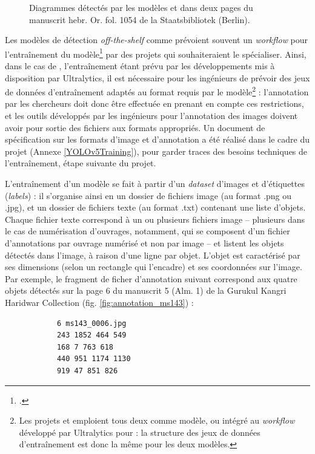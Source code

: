 \begin{figure}[H]
\begin{subfigure}{1\linewidth}
			\end{subfigure}
			\caption{Diagrammes détectés par les modèles \yolov et \docex dans deux pages du manuscrit hebr. Or. fol. 1054 de la Staatsbibliotek (Berlin).}
			\label{fig:performances_modeles}
		\end{figure}
		
		Les modèles de détection \textit{off-the-shelf} comme \yolov prévoient souvent un \textit{workflow} pour l'entraînement du modèle\footcite{sharmaTrainingYOLOv5Object2022} par des projets qui souhaiteraient le spécialiser. Ainsi, dans le cas de \yolov, l'entraînement étant prévu par les développements mis à disposition par Ultralytics, il est nécessaire pour les ingénieurs de prévoir des jeux de données d'entraînement adaptés au format requis par le modèle\footnote{Les projets \vhs et \eida emploient tous deux \yolov comme modèle, ou \docex intégré au \textit{workflow} développé par Ultralytics pour \yolov : la structure des jeux de données d'entraînement est donc la même pour les deux modèles.} : l'annotation par les chercheurs doit donc être effectuée en prenant en compte ces restrictions, et les outils développés par les ingénieurs pour l'annotation des images doivent avoir pour sortie des fichiers aux formats appropriés. Un document de spécification sur les formats d'image et d'annotation a été réalisé dans le cadre du projet \eida (Annexe \ref{YOLOv5Training}), pour garder traces des besoins techniques de l'entraînement, étape suivante du projet. 
		
		L'entraînement d'un modèle \yolov se fait à partir d'un \textit{dataset} d'images et d'étiquettes (\textit{labels}) : il s'organise ainsi en un dossier de fichiers image (au format .png ou .jpg), et un dossier de fichiers texte (au format .txt) contenant une liste d'objets. Chaque fichier texte correspond à un ou plusieurs fichiers image -- plusieurs dans le cas de numérisation d'ouvrages, notamment, qui se composent d'un fichier d'annotations par ouvrage numérisé et non par image -- et listent les objets détectés dans l'image, à raison d'une ligne par objet. L'objet est caractérisé par ses dimensions (selon un rectangle qui l'encadre) et ses coordonnées sur l'image. Par exemple, le fragment de ficher d'annotation suivant correspond aux quatre objets détectés sur la page 6 du manuscrit 5 (Alm. 1) de la Gurukul Kangri Haridwar Collection (fig. \ref{fig:annotation_ms143}) :
		
		\begin{verbatim}
			6 ms143_0006.jpg
			243 1852 464 549
			168 7 763 618
			440 951 1174 1130
			919 47 851 826
		\end{verbatim}

